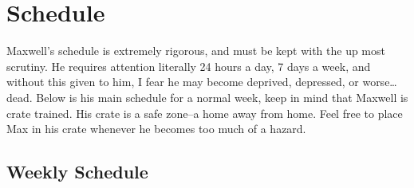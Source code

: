 \documentclass[pdftex,12pt]{article}
\begin{document}
\newpage
\section{Schedule}

Maxwell's schedule is extremely rigorous, and must be kept with the up most
scrutiny. He requires attention literally 24 hours a day, 7 days a week, and
without this given to him, I fear he may become deprived, depressed, or
worse\ldots dead. Below is his main schedule for a normal week, keep in mind that
Maxwell is crate trained. His crate is a safe zone--a home away from home. Feel
free to place Max in his crate whenever he becomes too much of a hazard.

\subsection{Weekly Schedule}
\end{document}
